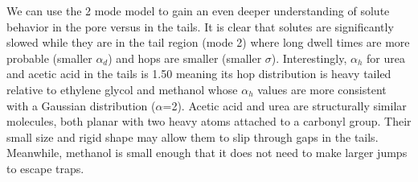 \documentclass{article}
\begin{document}
  We can use the 2 mode model to gain an even deeper understanding of solute behavior
  in the pore versus in the tails. It is clear that solutes are significantly slowed 
  while they are in the tail region (mode 2) where long dwell times are more probable
  (smaller $\alpha_d$) and hops are smaller (smaller $\sigma$). Interestingly, 
  $\alpha_h$ for urea and acetic acid in the tails is 1.50 meaning its hop distribution
  is heavy tailed relative to ethylene glycol and methanol whose $\alpha_h$ values are
  more consistent with a Gaussian distribution ($\alpha$=2). Acetic acid and urea are
  structurally similar molecules, both planar with two heavy atoms attached to a 
  carbonyl group. Their small size and rigid shape may allow them to slip through 
  gaps in the tails. Meanwhile, methanol is small enough that it does not need to make 
  larger jumps to escape traps. 
  

  
\end{document}
